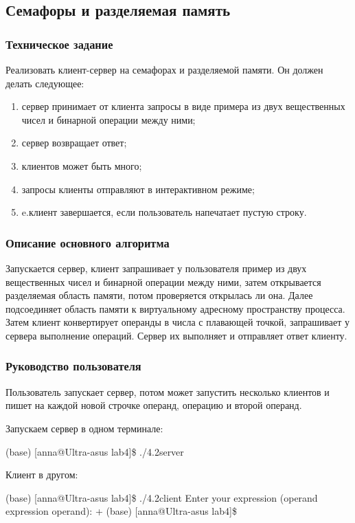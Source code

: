 \documentclass[a4paper,12pt]{extarticle}
\begin{document}
\subsection{Семафоры и разделяемая память}
\subsubsection{Техническое задание}
Реализовать клиент-сервер на семафорах и разделяемой памяти. Он должен делать следующее:
\begin{enumerate} 
  \item сервер принимает от клиента запросы в виде примера из двух вещественных чисел и бинарной операции между ними;
  \item  сервер возвращает ответ;
  \item клиентов может быть много;
  \item запросы клиенты отправляют в интерактивном режиме;
  \item e.клиент завершается, если пользователь напечатает пустую строку.
\end{enumerate}

\subsubsection{Описание основного алгоритма}
Запускается сервер, клиент запрашивает у пользователя пример из двух вещественных чисел и бинарной операции между ними, затем открывается разделяемая область памяти, потом проверяется открылась ли она. Далее подсоединяет область памяти к виртуальному адресному пространству процесса. Затем клиент конвертирует операнды в числа с плавающей точкой, запрашивает у сервера выполнение операций. Сервер их выполняет и отправляет ответ клиенту.

\subsubsection{Руководство пользователя}
Пользователь запускает сервер, потом может запустить несколько клиентов и пишет на каждой новой строчке операнд, операцию и второй операнд.

Запускаем сервер в одном терминале:

(base) [anna@Ultra-asus lab4]\$ ./4.2server \newline

Клиент в другом:

(base) [anna@Ultra-asus lab4]\$ ./4.2client \newline
Enter your expression (operand expression operand):\newline
+\newline
(base) [anna@Ultra-asus lab4]\$\newline
\end{document}
